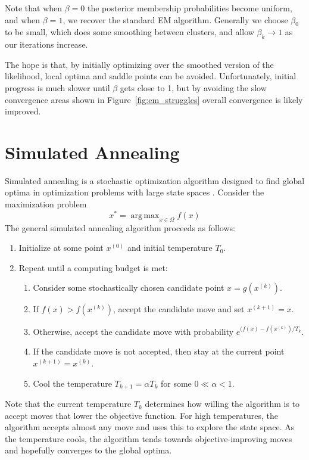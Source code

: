 \documentclass{article}
\DeclareMathOperator*{\argmax}{arg\,max}
\theoremstyle{definition}
\theoremstyle{algodesc}
\begin{document}
Note that when $\beta = 0$ the posterior membership probabilities become uniform, and when $\beta = 1$, we recover the standard EM algorithm. Generally we choose $\beta_0$ to be small, which does some smoothing between clusters, and allow $\beta_k \to 1$ as our iterations increase.

The hope is that, by initially optimizing over the smoothed version of the likelihood, local optima and saddle points can be avoided. Unfortunately, initial progress is much slower until $\beta$ gets close to 1, but by avoiding the slow convergence areas shown in Figure~\ref{fig:em_struggles} overall convergence is likely improved.


\section{Simulated Annealing}

Simulated annealing is a stochastic optimization algorithm designed to find global optima in optimization problems with large state spaces \cite{kirkpatrickgelattvecchi83}. Consider the maximization problem
\begin{equation*}
x^* = \argmax_{x \in \Omega} f(x)
\end{equation*}
The general simulated annealing algorithm proceeds as follows:
\begin{enumerate}
\item Initialize at some point $x^{(0)}$ and initial temperature $T_0$.
\item Repeat until a computing budget is met:
  \begin{enumerate}
  \item Consider some stochastically chosen candidate point $x = g(x^{(k)})$.
  \item If $f(x) > f(x^{(k)})$, accept the candidate move and set $x^{(k+1)} = x$.
  \item Otherwise, accept the candidate move with probability $e^{(f(x) - f(x^{(k)})/T_k}$.
  \item If the candidate move is not accepted, then stay at the current point $x^{(k+1)} = x^{(k)}$.
  \item Cool the temperature $T_{k+1} = \alpha T_k$ for some $0 \ll \alpha < 1$.
  \end{enumerate}
\end{enumerate}

Note that the current temperature $T_k$ determines how willing the algorithm is to accept moves that lower the objective function. For high temperatures, the algorithm accepts almost any move and uses this to explore the state space. As the temperature cools, the algorithm tends towards objective-improving moves and hopefully converges to the global optima.
\end{document}
